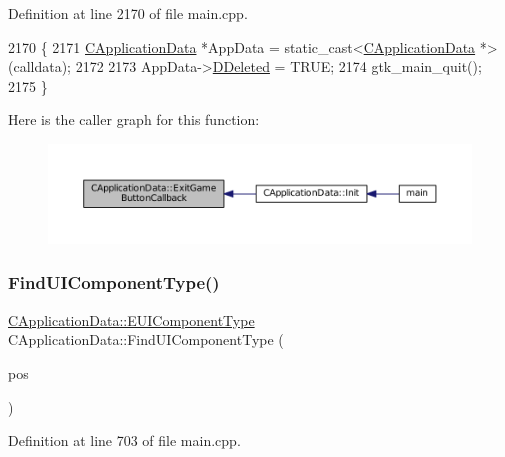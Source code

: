Definition at line 2170 of file main.\+cpp.


\begin{DoxyCode}
2170                                                            \{
2171     \hyperlink{classCApplicationData}{CApplicationData} *AppData = \textcolor{keyword}{static\_cast<}\hyperlink{classCApplicationData}{CApplicationData} *\textcolor{keyword}{>}(calldata);
2172     
2173     AppData->\hyperlink{classCApplicationData_a0a8651f95f3d48befd6e02a286ecdc82}{DDeleted} = TRUE;
2174     gtk\_main\_quit();
2175 \}
\end{DoxyCode}
Here is the caller graph for this function\+:
\nopagebreak
\begin{figure}[H]
\begin{center}
\leavevmode
\includegraphics[width=350pt]{classCApplicationData_a6a2c934fee258ccdb2a4a70c075f79fd_icgraph}
\end{center}
\end{figure}
\hypertarget{classCApplicationData_a1fb2747750babd9b82f51ce206ee6755}{}\label{classCApplicationData_a1fb2747750babd9b82f51ce206ee6755} 
\subsubsection{\texorpdfstring{Find\+U\+I\+Component\+Type()}{FindUIComponentType()}}
{\footnotesize\ttfamily \hyperlink{classCApplicationData_ad49585591fc53bff1c89bc512170280d}{C\+Application\+Data\+::\+E\+U\+I\+Component\+Type} C\+Application\+Data\+::\+Find\+U\+I\+Component\+Type (\begin{DoxyParamCaption}\item[{const \hyperlink{classCPosition}{C\+Position} \&}]{pos }\end{DoxyParamCaption})\hspace{0.3cm}{\ttfamily [protected]}}



Definition at line 703 of file main.\+cpp.


